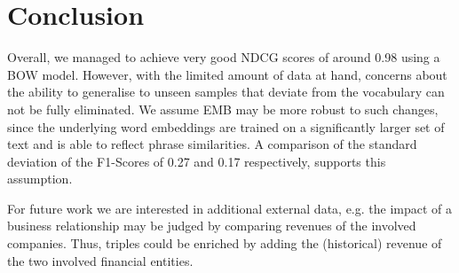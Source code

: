 \section{Conclusion}

Overall, we managed to achieve very good NDCG scores of around 0.98 using a BOW model.
However, with the limited amount of data at hand, concerns about the ability to generalise to unseen samples that deviate from the vocabulary can not be fully eliminated.
We assume EMB may be more robust to such changes, since the underlying word embeddings are trained on a significantly larger set of text and is able to reflect phrase similarities.
A comparison of the standard deviation of the F1-Scores of 0.27 and 0.17 respectively, supports this assumption.

For future work we are interested in additional external data, e.g. the impact of a business relationship may be judged by comparing revenues of the involved companies.
Thus, triples could be enriched by adding the (historical) revenue of the two involved financial entities. 



%


